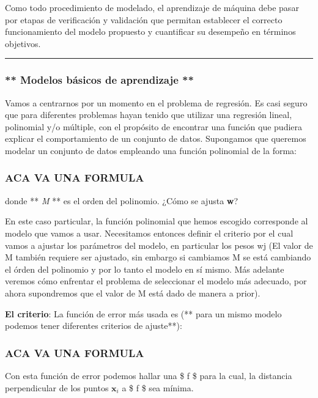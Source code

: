 \documentclass[11pt]{article}
\begin{document}
Como todo procedimiento de modelado, el aprendizaje de máquina debe
pasar por etapas de verificación y validación que permitan establecer el
correcto funcionamiento del modelo propuesto y cuantificar su desempeño
en términos objetivos.

\begin{center}\rule{0.5\linewidth}{\linethickness}\end{center}

    \subsubsection{** Modelos básicos de aprendizaje
**}\label{modelos-buxe1sicos-de-aprendizaje}

    Vamos a centrarnos por un momento en el problema de regresión. Es casi
seguro que para diferentes problemas hayan tenido que utilizar una
regresión lineal, polinomial y/o múltiple, con el propósito de encontrar
una función que pudiera explicar el comportamiento de un conjunto de
datos. Supongamos que queremos modelar un conjunto de datos empleando
una función polinomial de la forma:

\subsubsection{ACA VA UNA FORMULA}\label{aca-va-una-formula}

donde ** \emph{M} ** es el orden del polinomio. ¿Cómo se ajusta
\textbf{w}?

En este caso particular, la función polinomial que hemos escogido
corresponde al modelo que vamos a usar. Necesitamos entonces definir el
criterio por el cual vamos a ajustar los parámetros del modelo, en
particular los pesos wj (El valor de M también requiere ser ajustado,
sin embargo si cambiamos M se está cambiando el órden del polinomio y
por lo tanto el modelo en sí mismo. Más adelante veremos cómo enfrentar
el problema de seleccionar el modelo más adecuado, por ahora supondremos
que el valor de M está dado de manera a prior).

\textbf{El criterio}: La función de error más usada es (** para un mismo
modelo podemos tener diferentes criterios de ajuste**):

\subsubsection{ACA VA UNA FORMULA}\label{aca-va-una-formula-1}

Con esta función de error podemos hallar una \$ f \$ para la cual, la
distancia perpendicular de los puntos \(\mathbf{x}_{i}\) a \$ f \$ sea
mínima.
\end{document}
